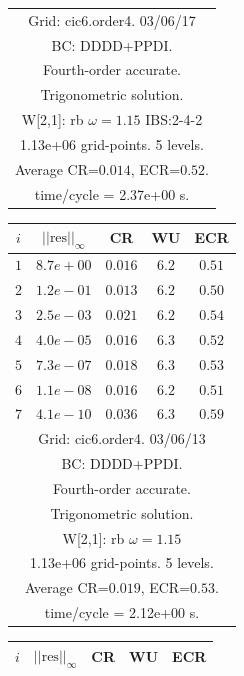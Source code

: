 \begin{table}[hbt]
\begin{center}
{\begin{tabular}{|c|c|c|c|c|}
\hline 
\multicolumn{5}{|c|}{Grid: cic6.order4. 03/06/17}  \\
\multicolumn{5}{|c|}{BC: DDDD+PPDI.}  \\
\multicolumn{5}{|c|}{Fourth-order accurate.}  \\
\multicolumn{5}{|c|}{Trigonometric solution.}  \\
\multicolumn{5}{|c|}{W[2,1]: rb $\omega=1.15$ IBS:2-4-2}  \\
\multicolumn{5}{|c|}{1.13e+06 grid-points. 5 levels.}  \\
\multicolumn{5}{|c|}{Average CR=$0.014$, ECR=$0.52$.}  \\
\multicolumn{5}{|c|}{time/cycle = 2.37e+00 s.}  \\
\hline 
\end{tabular}
\begin{tabular}{|c|c|c|c|c|} \hline 
 $i$   & $\vert\vert\mbox{res}\vert\vert_\infty$  &  CR     &  WU    & ECR  \\   \hline 
 $ 1$  & $ 8.7e+00$ & $0.016$ & $ 6.2$ & $0.51$ \\ 
 $ 2$  & $ 1.2e-01$ & $0.013$ & $ 6.2$ & $0.50$ \\ 
 $ 3$  & $ 2.5e-03$ & $0.021$ & $ 6.2$ & $0.54$ \\ 
 $ 4$  & $ 4.0e-05$ & $0.016$ & $ 6.3$ & $0.52$ \\ 
 $ 5$  & $ 7.3e-07$ & $0.018$ & $ 6.3$ & $0.53$ \\ 
 $ 6$  & $ 1.1e-08$ & $0.016$ & $ 6.2$ & $0.51$ \\ 
 $ 7$  & $ 4.1e-10$ & $0.036$ & $ 6.3$ & $0.59$ \\ 
\hline 
\multicolumn{5}{|c|}{Grid: cic6.order4. 03/06/13}  \\
\multicolumn{5}{|c|}{BC: DDDD+PPDI.}  \\
\multicolumn{5}{|c|}{Fourth-order accurate.}  \\
\multicolumn{5}{|c|}{Trigonometric solution.}  \\
\multicolumn{5}{|c|}{W[2,1]: rb $\omega=1.15$}  \\
\multicolumn{5}{|c|}{1.13e+06 grid-points. 5 levels.}  \\
\multicolumn{5}{|c|}{Average CR=$0.019$, ECR=$0.53$.}  \\
\multicolumn{5}{|c|}{time/cycle = 2.12e+00 s.}  \\
\hline 
\end{tabular}
\begin{tabular}{|c|c|c|c|c|} \hline 
 $i$   & $\vert\vert\mbox{res}\vert\vert_\infty$  &  CR     &  WU    & ECR  \\   \hline 

\end{tabular}}
\end{center}
\end{table}
